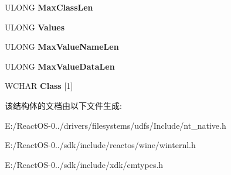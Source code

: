 \begin{DoxyCompactItemize}
U\+L\+O\+NG {\bfseries Max\+Class\+Len}
\item 
\mbox{\label{struct___k_e_y___f_u_l_l___i_n_f_o_r_m_a_t_i_o_n_a04fee5f2776a2da3a4f5f21e7e8ff868}} 
U\+L\+O\+NG {\bfseries Values}
\item 
\mbox{\label{struct___k_e_y___f_u_l_l___i_n_f_o_r_m_a_t_i_o_n_a4fdae73de468a4516774ddcc4a590a09}} 
U\+L\+O\+NG {\bfseries Max\+Value\+Name\+Len}
\item 
\mbox{\label{struct___k_e_y___f_u_l_l___i_n_f_o_r_m_a_t_i_o_n_ab5e3cf172760b9aaaead073236dc495f}} 
U\+L\+O\+NG {\bfseries Max\+Value\+Data\+Len}
\item 
\mbox{\label{struct___k_e_y___f_u_l_l___i_n_f_o_r_m_a_t_i_o_n_a0f880c120052afcb56d6c2a08c906b7d}} 
W\+C\+H\+AR {\bfseries Class} \mbox{[}1\mbox{]}
\end{DoxyCompactItemize}


该结构体的文档由以下文件生成\+:\begin{DoxyCompactItemize}
\item 
E\+:/\+React\+O\+S-\/0../drivers/filesystems/udfs/\+Include/nt\+\_\+native.\+h\item 
E\+:/\+React\+O\+S-\/0../sdk/include/reactos/wine/winternl.\+h\item 
E\+:/\+React\+O\+S-\/0../sdk/include/xdk/cmtypes.\+h\end{DoxyCompactItemize}
